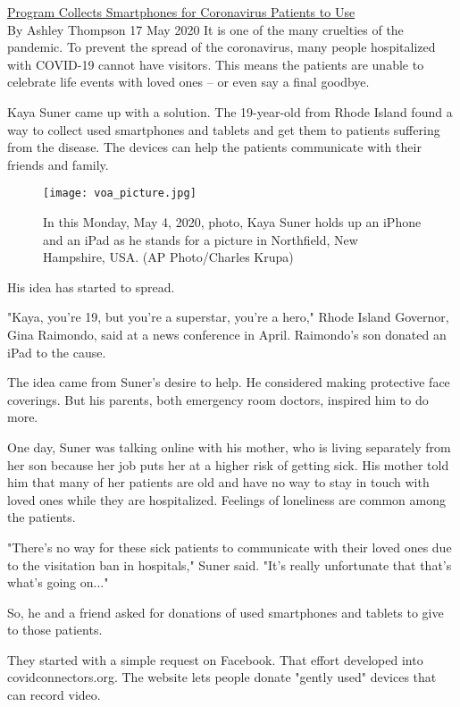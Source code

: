 \href{https://www.51voa.com/VOA_Special_English/program-collects-smartphones-for-coronavirus-hospital-patients-to-use-84557.html}{Program Collects Smartphones for Coronavirus Patients to Use} \\
 
By Ashley Thompson
17 May 2020
It is one of the many cruelties of the pandemic. To prevent the spread of the coronavirus, many people hospitalized with COVID-19 cannot have visitors. This means the patients are unable to celebrate life events with loved ones – or even say a final goodbye.

Kaya Suner came up with a solution. The 19-year-old from Rhode Island found a way to collect used smartphones and tablets and get them to patients suffering from the disease. The devices can help the patients communicate with their friends and family.

\begin{figure}[h] %
    \centering
    \texttt{[image: voa\_picture.jpg]}
    \caption{In this Monday, May 4, 2020, photo, Kaya Suner holds up an iPhone and an iPad as he stands for a picture in Northfield, New Hampshire, USA. (AP Photo/Charles Krupa)}
\end{figure}

His idea has started to spread.

"Kaya, you're 19, but you're a superstar, you're a hero," Rhode Island Governor, Gina Raimondo, said at a news conference in April. Raimondo's son donated an iPad to the cause.

The idea came from Suner's desire to help. He considered making protective face coverings. But his parents, both emergency room doctors, inspired him to do more.

One day, Suner was talking online with his mother, who is living separately from her son because her job puts her at a higher risk of getting sick. His mother told him that many of her patients are old and have no way to stay in touch with loved ones while they are hospitalized. Feelings of loneliness are common among the patients.

"There's no way for these sick patients to communicate with their loved ones due to the visitation ban in hospitals," Suner said. "It's really unfortunate that that's what's going on..."

So, he and a friend asked for donations of used smartphones and tablets to give to those patients.

They started with a simple request on Facebook. That effort developed into covidconnectors.org. The website lets people donate "gently used" devices that can record video.

